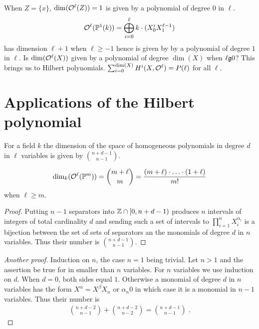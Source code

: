 \documentclass[a4paper,parskip=half,numbers=enddot, DIV=12]{scrreprt}
\begin{document}
\begin{rem*}
    When $Z=\{x\}$, $\dim(\mathcal{O}^\ell(Z)) = 1$ is given by a polynomial of degree $0$ in $\ell$. 
    \begin{align*}
        \mathcal{O}^\ell(\mathbb{P}^1(k)) = \bigoplus_{i=0}^\ell k\cdot(X_0^iX_1^{\ell-1})
    \end{align*}
    has dimension $\ell+1$ when $\ell\geq -1$ hence is given by by a polynomial of degree $1$ in $\ell$. Is $\dim(\mathcal{O}^\ell(X))$ given by a polynomial of degree $\dim(X)$ when $\ell \gge 0$? This brings us to Hilbert polynomials.  $\sum_{i=0}^{\dim (X)} H^i(X,\mathcal{O}^\ell) = P(\ell)$ for all $\ell$.
\end{rem*}



\chapter{Applications of the Hilbert polynomial}

\begin{lem}
    For a field $k$ the dimension of the space of homogeneous polynomials in degree $d$ in $\ell$ variables is given by $\binom{n+d-1}{n-1}$.
\end{lem}
\begin{cor}
    \begin{align*}
        \dim_k(\mathcal{O}^\ell(\mathbb{P}^m)) = \binom{m+\ell}{m} = \frac{(m+\ell)\cdot\ldots\cdot (1+\ell)}{m!}
    \end{align*}
    when $\ell\geq m$.
\end{cor}
\begin{proof}
    Putting $n-1$ separators into $\mathbb{Z}\cap [0,n+d-1)$ produces $n$ intervals of integers of total cardinality $d$ and sending such a set of intervals to $\prod_{i=1}^n X_i^{\alpha_i}$ is a bijection between the set of sets of separators an the monomials of degree $d$ in $n$ variables. Thus their number is $\binom{n+d-1}{n-1}$.
\end{proof}
\begin{proof}[Another proof]
    Induction on $n$, the case $n=1$ being trivial. Let $n>1$ and the assertion be true for in smaller than $n$ variables. For $n$ variables we use induction on $d$. When $d=0$, both sides equal $1$. Otherwise a monomial of degree $d$ in $n$ variables has the form $X^\alpha = X^\beta X_n$ or $\alpha_n 0$ in which case it is a monomial in $n-1$ variables. Thus their number is 
    \begin{align*}
         \binom{n+d-2}{n-1} +\binom{n+d-2}{n-2} = \binom{n+d-1}{n-1}\;.
    \end{align*}
\end{proof}
\end{document}
